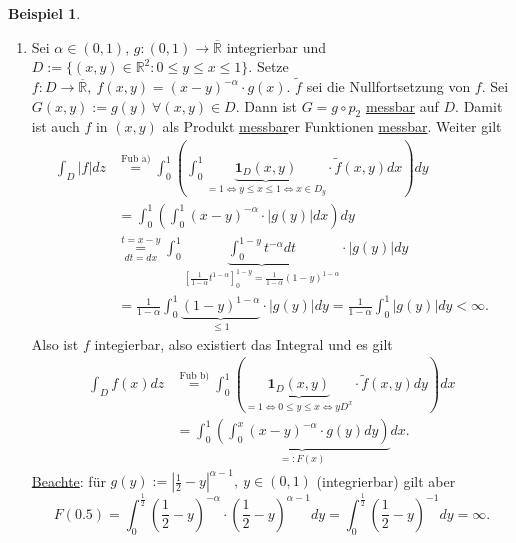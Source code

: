 \documentclass[a4paper]{scrreprt}
\newcommand{\doubleOne}{\textbf{1}}
\newcommand{\R}{\mathbb{R}}
\newcommand{\Rq}{\overline{\R}}
\newcommand{\jlabel}[1]{\label{j_#1}}
\newcommand{\jhyperref}[2]{\hyperref[j_#1]{#2}}
\newcommand{\jlink}[1]{\jhyperref{#1}{#1}}
\newcommand{\jabb}[3]{ #1: #2 \rightarrow #3 }
\newcommand{\jshortlinkFubiniA}{\jhyperref{FubiniA}{\text{Fub a)}}}
\newcommand{\jshortlinkFubiniB}{\jhyperref{FubiniB}{\text{Fub b)}}}
\newcommand{\jspacesmall}{\vspace{4pt}}
\newcommand{\jdate}[1]{\jspacesmall\begin{center}\jlabel{#1}\tiny{Ana III, #1}\end{center}}
\theoremstyle{plain}
\theoremstyle{definition}
\newtheorem*{expl*}{Beispiel}
\begin{document}
{{{{\begin{expl*}
\begin{enumerate}
\jdate{15.12.2008}

        \item 
            Sei $\alpha \in (0,1)$, $\jabb{g}{(0,1)}{\Rq}$ integrierbar und $D:=\{(x,y)\in \R^2 : 0 \le y \le x \le 1\}$. Setze $\jabb{f}{D}{\Rq}, \ f(x,y) = (x-y)^{-\alpha}\cdot g(x)$. $\tilde{f}$ sei die Nullfortsetzung von $f$. Sei $G(x,y):=g(y) \ \forall (x,y)\in D$. Dann ist $G = g\circ p_2$ \jlink{messbar} auf $D$. Damit ist auch $f$ in $(x,y)$ als Produkt \jlink{messbar}er Funktionen \jlink{messbar}. Weiter gilt
            \begin{displaymath}
                \begin{split}
                    \int_D |f| dz &\overset{\jshortlinkFubiniA}{=} \int_0^1 \left( \int_0^1 \underbrace{\doubleOne_D(x,y)}_{=1 \Leftrightarrow y \le x \le 1 \Leftrightarrow x\in D_y} \cdot \tilde{f}(x,y) dx \right)dy\\
                    &= \int_0^1 \left ( \int_0^1 (x-y)^{-\alpha} \cdot |g(y)| dx \right) dy\\
                    &\underset{dt=dx}{\overset{t=x-y}{=}} \int_0^1 \underbrace{\int_0^{1-y} t^{-\alpha}dt}_{\left [\frac{1}{1-\alpha} t^{1-\alpha} \right]_0^{1-y} = \frac{1}{1-\alpha}(1-y)^{1-\alpha}} \cdot |g(y)| dy\\
                    &= \frac{1}{1-\alpha} \int_0^1 \underbrace{(1-y)^{1-\alpha}}_{\le 1} \cdot |g(y)| dy = \frac{1}{1-\alpha} \int_0^1 |g(y)|dy < \infty.
                \end{split}
            \end{displaymath}
            Also ist $f$ integierbar, also existiert das Integral und es gilt
            \begin{displaymath}
                \begin{split}
                    \int_D f(x)dz &\overset{\jshortlinkFubiniB}{=} \int_0^1\left ( \underbrace{\doubleOne_D(x,y)}_{=1 \Leftrightarrow 0 \le y \le x \Leftrightarrow y D^x}\cdot \tilde{f}(x,y)dy \right )dx\\
                    &=\int_0^1 \underbrace{\left( \int_0^x (x-y)^{-\alpha} \cdot g(y) dy\right)}_{=: F(x)}dx.
                \end{split}
            \end{displaymath}
            \underline{Beachte}: für $g(y) := |\frac{1}{2}-y|^{\alpha-1},\ y \in (0,1)$ (integrierbar) gilt aber
            \begin{displaymath}
                F(0.5) = \int_0^{\frac{1}{2}} \left(\frac{1}{2}-y \right)^{-\alpha} \cdot \left(\frac{1}{2}-y \right)^{\alpha-1} dy = \int_0^{\frac{1}{2}} \left(\frac{1}{2}-y \right)^{-1} dy = \infty.
            \end{displaymath}


\end{enumerate}
\end{expl*}}}}}
\end{document}
